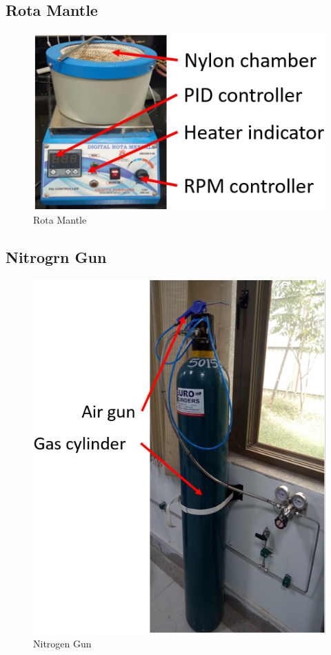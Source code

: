 \subsection{Rota Mantle}
\begin{figure}[H]
	\centering
   \includegraphics[scale=0.56]{Images/9.png} 
   \caption{Rota Mantle}
\end{figure}

\subsection{Nitrogrn Gun}
\begin{figure}[H]
	\centering
   \includegraphics[scale=0.56]{Images/10.png} 
   \caption{Nitrogen Gun}
\end{figure}

